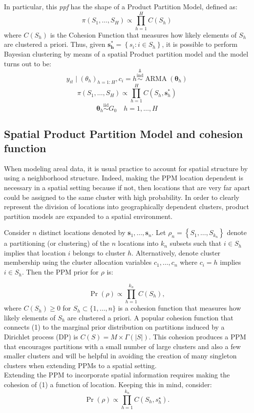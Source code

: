 \documentclass[12pt,a4paper]{article}
\begin{document}
In particular, this \textit{ppf} has the shape of a Product Partition Model, defined as: 
$$ \pi(S_1, … ,S_H) \propto \prod_{h=1}^{H} C(S_h)$$
where $C(S_h)$ is the Cohesion Function that measures how likely elements of $S_h$ are clustered a priori. Thus, given $\boldsymbol{s_h^{*}}= \left\{s_i: i\in S_h \right\}$, it is possible to perform Bayesian clustering by means of a spatial Product partition model and the model turns out to be:
$$ y_{i t} \mid\left(\theta_h\right)_{h=1: H}, c_i=h \stackrel{\Perp}{\overset{\mathrm{ind}}{\sim} } \operatorname{ARMA}\left(\boldsymbol{\theta}_h\right)
$$
$$
\pi\left(S_1, \ldots, S_H\right) \propto \prod_{h=1}^H C\left(S_h, \boldsymbol{s}_h^*\right)
$$
$$
\boldsymbol{\theta}_h \stackrel{\mathrm{iid}}{\sim} G_0 \quad h=1, \ldots, H$$


\subsection{Spatial Product Partition Model and cohesion function}

When modeling areal data, it is usual practice to account for spatial structure by using a neighborhood structure. Indeed, making the PPM location dependent is necessary in a spatial setting because if not, then locations that are very far apart could be assigned to the same cluster with high probability. In order to clearly represent the division of locations into geographically dependent clusters, product partition models are expanded to a spatial environment.

Consider $n$ distinct locations denoted by $\boldsymbol{s}_1, \ldots, \boldsymbol{s}_n$. Let $\rho_n=\left\{S_1, \ldots, S_{k_n}\right\}$ denote a partitioning (or clustering) of the $n$ locations into $k_n$ subsets such that $i \in S_h$ implies that location $i$ belongs to cluster $h$. Alternatively, denote cluster membership using the cluster allocation variables $c_1, \ldots, c_n$ where $c_i=h$ implies $i\in S_h$. Then the PPM prior for $\rho$ is:

\begin{equation}
\operatorname{Pr}(\rho) \propto \prod_{h=1}^{k_n} C\left(S_h\right),
\end{equation}
where $C\left(S_h\right) \geq 0$ for $S_h \subset\{1, \ldots, n\}$ is a cohesion function that measures how likely elements of $S_h$ are clustered a priori. A popular cohesion function that connects (1) to the marginal prior distribution on partitions induced by a Dirichlet process (DP) is $C(S)=M \times \Gamma(|S|)$. This cohesion produces a PPM that encourages partitions with a small number of large clusters and also a few smaller clusters and will be helpful in avoiding the creation of many singleton clusters when extending PPMs to a spatial setting.\\
Extending the PPM to incorporate spatial information requires making the cohesion of (1) a function of location. Keeping this in mind, consider:
$$
\operatorname{Pr}(\rho) \propto \prod_{h=1}^{k_n} C\left(S_h, s_h^{\star}\right) .
$$
\end{document}
